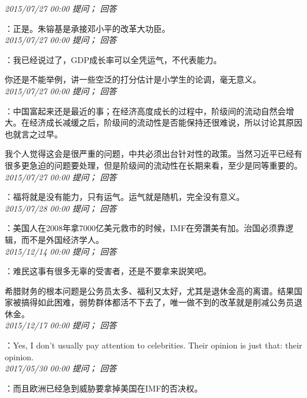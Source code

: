 \documentclass[twocolumn]{ctexart}
\begin{document}
\textit{\hfill\noindent\small 2015/07/27 00:00 提问； 回答}

：正是。朱镕基是承接邓小平的改革大功臣。\\

\textit{\hfill\noindent\small 2015/07/27 00:00 提问； 回答}

：我已经说过了，GDP成长率可以全凭运气，不代表能力。

你还是不能举例，讲一些空泛的打分估计是小学生的论调，毫无意义。\\

\textit{\hfill\noindent\small 2015/07/27 00:00 提问； 回答}

：中国富起来还是最近的事；在经济高度成长的过程中，阶级间的流动自然会增大。在经济成长减缓之后，阶级间的流动性是否能保持还很难说，所以讨论其原因也就言之过早。

我个人觉得这会是很严重的问题，中共必须出台针对性的政策。当然习近平已经有很多更急迫的问题要处理，但是阶级间的流动性在长期来看，至少是同等重要的。\\

\textit{\hfill\noindent\small 2015/07/27 00:00 提问； 回答}

：福将就是没有能力，只有运气。运气就是随机，完全没有意义。\\

\textit{\hfill\noindent\small 2015/07/28 00:00 提问； 回答}

：美国人在2008年拿7000亿美元救市的时候，IMF在旁讚美有加。治国必须靠逻辑，而不是外国经济学人。\\

\textit{\hfill\noindent\small 2015/12/14 00:00 提问； 回答}

：难民这事有很多无辜的受害者，还是不要拿来説笑吧。

希腊财务的根本问题是公务员太多、福利又太好，尤其是退休金高的离谱。结果国家被搞得如此困难，弱势群体都活不下去了，唯一做不到的改革就是削减公务员退休金。\\

\textit{\hfill\noindent\small 2015/12/17 00:00 提问； 回答}

：Yes, I don't usually pay attention to celebrities. Their opinion is just that: their opinion.\\

\textit{\hfill\noindent\small 2017/05/30 00:00 提问； 回答}

：而且欧洲已经急到威胁要拿掉美国在IMF的否决权。\\
\end{document}
